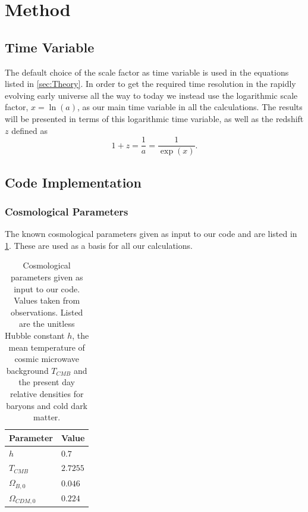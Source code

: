 \documentclass[10pt,a4paper]{article}
\begin{document}
\section{Method}
\label{sec:Method}
\subsection{Time Variable}
\label{subsec:Method/Time variable}
The default choice of the scale factor as time variable is used in the equations listed in \cref{sec:Theory}. In order to get the required time resolution in the rapidly evolving early universe all the way to today we instead use the logarithmic scale factor, $x= \ln(a)$, as our main time variable in all the calculations. The results will be presented in terms of this logarithmic time variable, as well as the redshift $z$ defined as
%
\begin{equation}
    1+z = \frac{1}{a} = \frac{1}{\exp(x)}.
    \label{eq:redshift}
\end{equation}

\subsection{Code Implementation}
\label{subsec:Method/Code Implementation}

\subsubsection{Cosmological Parameters}
\label{subsubsec:Method/Cosmological parameters}
The known cosmological parameters given as input to our code and are listed in \cref{tab:input_parameters}. These are used as a basis for all our calculations.
%
\begin{table}[ht]
    \centering
    \begin{tabular}{|l|l|}
    \hline
    Parameter      & Value    \\ \hline
    $h$            & $0.7$    \\ \hline
    $T_{CMB}$      & $2.7255$ \\ \hline
    $\Omega_{B,0}$     & $0.046$  \\ \hline
    $\Omega_{CDM,0}$ & $0.224$  \\ \hline
    \end{tabular}
    \caption{Cosmological parameters given as input to our code. Values taken from observations. Listed are the unitless Hubble constant $h$, the mean temperature of cosmic microwave background $T_{CMB}$ and the present day relative densities for baryons and cold dark matter.}
    \label{tab:input_parameters}
\end{table}
%
\end{document}

